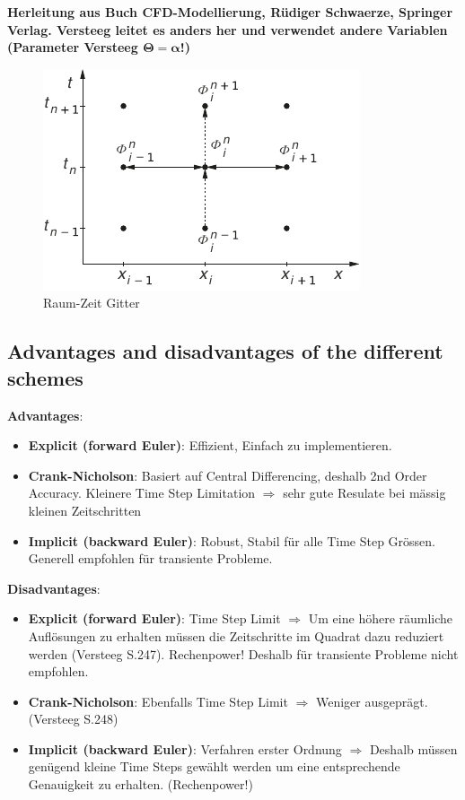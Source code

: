 \documentclass[a4paper]{scrartcl}
\begin{document}
\textbf{Herleitung aus Buch CFD-Modellierung, Rüdiger Schwaerze, Springer
Verlag. Versteeg leitet es anders her und verwendet andere Variablen
(Parameter Versteeg $\mathbf{\Theta = \alpha}$!)}

\begin{figure}[h!]
\begin{center}
\includegraphics[scale=1.0]{images/81.pdf}
\caption{Raum-Zeit Gitter}
\label{fig:81}
\end{center}
\end{figure}



\subsection{Advantages and disadvantages of the different schemes}
\textbf{Advantages}:
\begin{itemize}
\item \textbf{Explicit (forward Euler)}: Effizient, Einfach zu implementieren.

\item \textbf{Crank-Nicholson}:  Basiert auf Central Differencing, deshalb 2nd
Order Accuracy. Kleinere Time Step Limitation $\Rightarrow$ sehr gute Resulate
bei mässig kleinen Zeitschritten

\item \textbf{Implicit (backward Euler)}: Robust, Stabil für alle Time Step
Grössen. Generell empfohlen für transiente Probleme.
 

\end{itemize}

\textbf{Disadvantages}:
\begin{itemize}
\item \textbf{Explicit (forward Euler)}: Time Step Limit $\Rightarrow$ Um eine
höhere räumliche Auflösungen zu erhalten müssen die Zeitschritte im Quadrat dazu
reduziert werden (Versteeg S.247). Rechenpower! Deshalb für transiente Probleme
nicht empfohlen.

\item \textbf{Crank-Nicholson}: Ebenfalls Time Step Limit $\Rightarrow$ Weniger
ausgeprägt. (Versteeg S.248)

\item \textbf{Implicit (backward Euler)}: Verfahren erster Ordnung $\Rightarrow$
Deshalb müssen genügend kleine Time Steps gewählt werden um eine entsprechende
Genauigkeit zu erhalten. (Rechenpower!)

\end{itemize}
\end{document}
